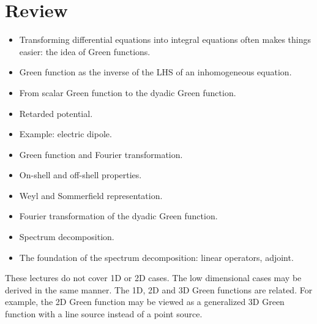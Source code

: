 \documentclass[hyperref, a4paper]{article}
\begin{document}
\section{Review}

\begin{itemize}
    \item Transforming differential equations into integral equations often makes things easier: the idea of Green functions.
    \item Green function as the inverse of the LHS of an inhomogeneous equation.
    \item From scalar Green function to the dyadic Green function.
    \item Retarded potential.
    \item Example: electric dipole.
    \item Green function and Fourier transformation.
    \item On-shell and off-shell properties.
    \item Weyl and Sommerfield representation.
    \item Fourier transformation of the dyadic Green function.
    \item Spectrum decomposition.
    \item The foundation of the spectrum decomposition: linear operators, adjoint.
\end{itemize}

These lectures do not cover 1D or 2D cases. The low dimensional cases may be derived in the same manner.
The 1D, 2D and 3D Green functions are related. For example, the 2D Green function may be viewed as a 
generalized 3D Green function with a line source instead of a point source.
\end{document}
